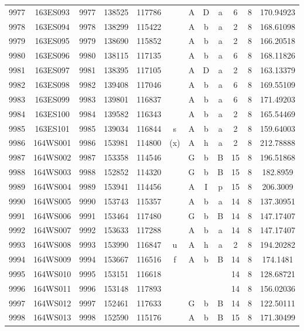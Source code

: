 \begin{tabular}{|*{12}{c|}}
9977 & 163ES093 & 9977 & 138525 & 117786 &  & A & D & a & 6 & 8 & 170.94923 \\ 
9978 & 163ES094 & 9978 & 138299 & 115422 &  & A & b & a & 2 & 8 & 168.61098 \\ 
9979 & 163ES095 & 9979 & 138690 & 115852 &  & A & b & a & 2 & 8 & 166.20518 \\ 
9980 & 163ES096 & 9980 & 138115 & 117135 &  & A & b & a & 6 & 8 & 168.11826 \\ 
9981 & 163ES097 & 9981 & 138395 & 117105 &  & A & D & a & 2 & 8 & 163.13379 \\ 
9982 & 163ES098 & 9982 & 139408 & 117046 &  & A & b & a & 6 & 8 & 169.55109 \\ 
9983 & 163ES099 & 9983 & 139801 & 116837 &  & A & b & a & 6 & 8 & 171.49203 \\ 
9984 & 163ES100 & 9984 & 139582 & 116343 &  & A & b & a & 2 & 8 & 165.54469 \\ 
9985 & 163ES101 & 9985 & 139034 & 116844 & s & A & b & a & 2 & 8 & 159.64003 \\ 
9986 & 164WS001 & 9986 & 153981 & 114800 & (x) & A & h & a & 2 & 8 & 212.78888 \\ 
9987 & 164WS002 & 9987 & 153358 & 114546 &  & G & b & B & 15 & 8 & 196.51868 \\ 
9988 & 164WS003 & 9988 & 152852 & 114320 &  & G & b & B & 15 & 8 & 182.8959 \\ 
9989 & 164WS004 & 9989 & 153941 & 114456 &  & A & I & p & 15 & 8 & 206.3009 \\ 
9990 & 164WS005 & 9990 & 153743 & 115357 &  & A & b & a & 14 & 8 & 137.30951 \\ 
9991 & 164WS006 & 9991 & 153464 & 117480 &  & G & b & B & 14 & 8 & 147.17407 \\ 
9992 & 164WS007 & 9992 & 153633 & 117288 &  & A & b & a & 14 & 8 & 147.17407 \\ 
9993 & 164WS008 & 9993 & 153990 & 116847 & u & A & h & a & 2 & 8 & 194.20282 \\ 
9994 & 164WS009 & 9994 & 153667 & 116516 & f & A & b & B & 14 & 8 & 174.1481 \\ 
9995 & 164WS010 & 9995 & 153151 & 116618 &  &  &  &  & 14 & 8 & 128.68721 \\ 
9996 & 164WS011 & 9996 & 153148 & 117893 &  &  &  &  & 14 & 8 & 156.02036 \\ 
9997 & 164WS012 & 9997 & 152461 & 117633 &  & G & b & B & 14 & 8 & 122.50111 \\ 
9998 & 164WS013 & 9998 & 152590 & 115176 &  & A & b & B & 15 & 8 & 171.30499 \\ 

\end{tabular}
